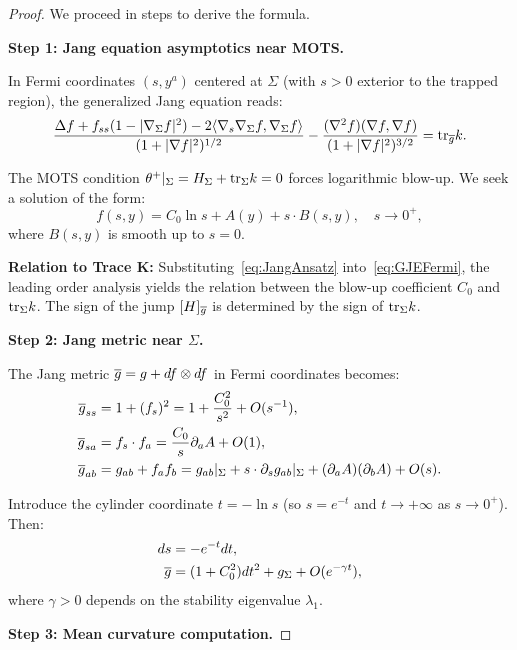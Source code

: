 \begin{proof}
We proceed in steps to derive the formula.

\textbf{Step 1: Jang equation asymptotics near MOTS.}

In Fermi coordinates $(s, y^a)$ centered at $\Sigma$ (with $s > 0$ exterior to the trapped region), the generalized Jang equation reads:
\begin{equation}\label{eq:GJEFermi}
    \frac{\Delta f + f_{ss}(1 - |\nabla_\Sigma f|^2) - 2\langle \nabla_s \nabla_\Sigma f, \nabla_\Sigma f\rangle}{(1 + |\nabla f|^2)^{1/2}} - \frac{(\nabla^2 f)(\nabla f, \nabla f)}{(1 + |\nabla f|^2)^{3/2}} = \mathrm{tr}_{\overline{g}} k.
\end{equation}

The MOTS condition $\theta^+|_\Sigma = H_\Sigma + \mathrm{tr}_\Sigma k = 0$ forces logarithmic blow-up. We seek a solution of the form:
\begin{equation}\label{eq:JangAnsatz}
    f(s, y) = C_0 \ln s + A(y) + s \cdot B(s, y), \quad s \to 0^+,
\end{equation}
where $B(s,y)$ is smooth up to $s = 0$.

\textbf{Relation to Trace K:} Substituting~\eqref{eq:JangAnsatz} into~\eqref{eq:GJEFermi}, the leading order analysis yields the relation between the blow-up coefficient $C_0$ and $\mathrm{tr}_\Sigma k$. The sign of the jump $[H]_{\overline{g}}$ is determined by the sign of $\mathrm{tr}_\Sigma k$.


\textbf{Step 2: Jang metric near $\Sigma$.}

The Jang metric $\overline{g} = g + df \otimes df$ in Fermi coordinates becomes:
\begin{align}
    \overline{g}_{ss} &= 1 + (f_s)^2 = 1 + \frac{C_0^2}{s^2} + O(s^{-1}), \\
    \overline{g}_{sa} &= f_s \cdot f_a = \frac{C_0}{s} \partial_a A + O(1), \\
    \overline{g}_{ab} &= g_{ab} + f_a f_b = g_{ab}|_\Sigma + s \cdot \partial_s g_{ab}|_\Sigma + (\partial_a A)(\partial_b A) + O(s).
\end{align}

Introduce the cylinder coordinate $t = -\ln s$ (so $s = e^{-t}$ and $t \to +\infty$ as $s \to 0^+$). Then:
\begin{align}
    ds &= -e^{-t} dt, \\
    \overline{g} &= (1 + C_0^2) dt^2 + g_\Sigma + O(e^{-\gamma t}),
\end{align}
where $\gamma > 0$ depends on the stability eigenvalue $\lambda_1$.

\textbf{Step 3: Mean curvature computation.}


\end{proof}
